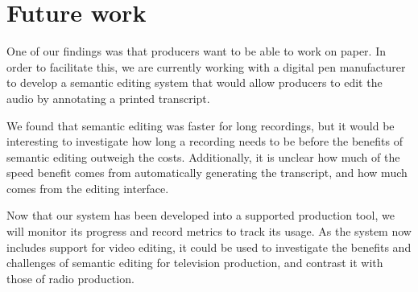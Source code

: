 \section{Future work}
One of our findings was that producers want to be able to work on paper. In
order to facilitate this, we are currently working with a digital pen
manufacturer to develop a semantic editing system that would allow producers to
edit the audio by annotating a printed transcript. 


We found that semantic editing was faster for long recordings, but it would be
interesting to investigate how long a recording needs to be before the benefits
of semantic editing outweigh the costs. Additionally, it is unclear how much of
the speed benefit comes from automatically generating the transcript, and how
much comes from the editing interface.



Now that our system has been developed into a supported production tool, we
will monitor its progress and record metrics to track its usage. As the
system now includes support for video editing, it could be used to investigate
the benefits and challenges of semantic editing for television production, and
contrast it with those of radio production.



